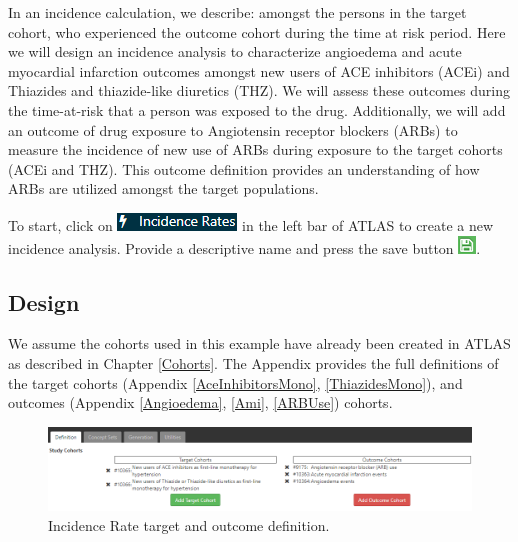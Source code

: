 \documentclass[11pt]{book}
\theoremstyle{definition}
\theoremstyle{definition}
\theoremstyle{definition}
\theoremstyle{remark}
\begin{document}
In an incidence calculation, we describe: amongst the persons in the target cohort, who experienced the outcome cohort during the time at risk period. Here we will design an incidence analysis to characterize angioedema and acute myocardial infarction outcomes amongst new users of ACE inhibitors (ACEi) and Thiazides and thiazide-like diuretics (THZ). We will assess these outcomes during the time-at-risk that a person was exposed to the drug. Additionally, we will add an outcome of drug exposure to Angiotensin receptor blockers (ARBs) to measure the incidence of new use of ARBs during exposure to the target cohorts (ACEi and THZ). This outcome definition provides an understanding of how ARBs are utilized amongst the target populations.

To start, click on \includegraphics{images/Characterization/atlasIncidenceMenuItem.png} in the left bar of ATLAS to create a new incidence analysis. Provide a descriptive name and press the save button \includegraphics{images/PopulationLevelEstimation/save.png}.

\hypertarget{design-2}{%
\subsection{Design}\label{design-2}}

We assume the cohorts used in this example have already been created in ATLAS as described in Chapter \ref{Cohorts}. The Appendix provides the full definitions of the target cohorts (Appendix \ref{AceInhibitorsMono}, \ref{ThiazidesMono}), and outcomes (Appendix \ref{Angioedema}, \ref{Ami}, \ref{ARBUse}) cohorts.

\begin{figure}

{\centering \includegraphics[width=1\linewidth]{images/Characterization/atlasIncidenceCohortSelection} 

}

\caption{Incidence Rate target and outcome definition.}\label{fig:atlasIncidenceCohortSelection}
\end{figure}
\end{document}
